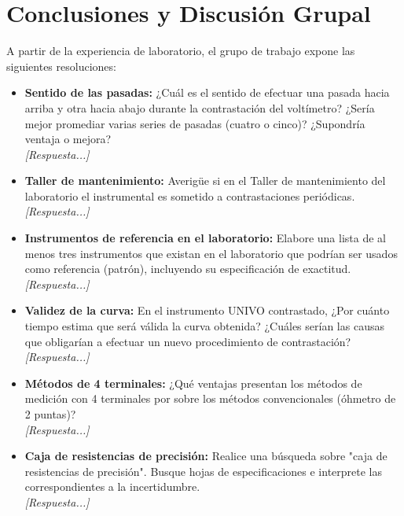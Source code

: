 \chapter{Conclusiones y Discusión Grupal}

A partir de la experiencia de laboratorio, el grupo de trabajo expone las siguientes resoluciones:

\begin{itemize}
    \item \textbf{Sentido de las pasadas:} ¿Cuál es el sentido de efectuar una pasada hacia arriba y otra hacia abajo durante la contrastación del voltímetro? ¿Sería mejor promediar varias series de pasadas (cuatro o cinco)? ¿Supondría ventaja o mejora?
    \\ \textit{[Respuesta...]}

    \item \textbf{Taller de mantenimiento:} Averigüe si en el Taller de mantenimiento del laboratorio el instrumental es sometido a contrastaciones periódicas.
    \\ \textit{[Respuesta...]}

    \item \textbf{Instrumentos de referencia en el laboratorio:} Elabore una lista de al menos tres instrumentos que existan en el laboratorio que podrían ser usados como referencia (patrón), incluyendo su especificación de exactitud.
    \\ \textit{[Respuesta...]}

    \item \textbf{Validez de la curva:} En el instrumento UNIVO contrastado, ¿Por cuánto tiempo estima que será válida la curva obtenida? ¿Cuáles serían las causas que obligarían a efectuar un nuevo procedimiento de contrastación?
    \\ \textit{[Respuesta...]}

    \item \textbf{Métodos de 4 terminales:} ¿Qué ventajas presentan los métodos de medición con 4 terminales por sobre los métodos convencionales (óhmetro de 2 puntas)?
    \\ \textit{[Respuesta...]}

    \item \textbf{Caja de resistencias de precisión:} Realice una búsqueda sobre "caja de resistencias de precisión". Busque hojas de especificaciones e interprete las correspondientes a la incertidumbre.
    \\ \textit{[Respuesta...]}


\end{itemize}

